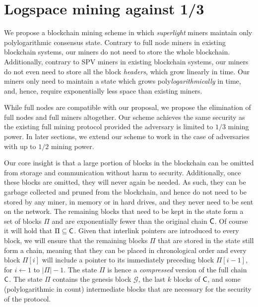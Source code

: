 \section{Logspace mining against 1/3}\label{sec.mining13}

We propose a blockchain mining scheme in which \emph{superlight} miners maintain
only polylogarithmic consensus state. Contrary to full node miners in existing
blockchain systems, our miners do not need to store the whole blockchain.
Additionally, contrary to SPV miners in existing blockchain systems, our miners
do not even need to store all the block \emph{headers}, which grow linearly in
time. Our miners only need to maintain a state which grows
poly\emph{logarithmically} in time, and, hence, require exponentially less space
than existing miners.

While full nodes are compatible with our proposal, we propose the elimination of
full nodes and full miners altogether. Our scheme achieves the same security as
the existing full mining protocol provided the adversary is limited to $1/3$
mining power. In later sections, we extend our scheme to work in the case of
adversaries with up to $1/2$ mining power.

Our core insight is that a large portion of blocks in the blockchain can be
omitted from storage and communication without harm to security. Additionally,
once these blocks are omitted, they will never again be needed. As such, they
can be garbage collected and pruned from the blockchain, and hence do not need
to be stored by any miner, in memory or in hard drives, and they never need to
be sent on the network. The remaining blocks that need to be kept in the state
form a set of blocks $\Pi$ and are exponentially fewer than the original chain
$\mathsf{C}$. Of course it will hold that $\Pi \subseteq \mathsf{C}$. Given that
interlink pointers are introduced to every block,
we will ensure that the remaining blocks $\Pi$ that are stored in the state
still form a chain, meaning that they can be placed in chronological order and
every block $\Pi[i]$ will include a pointer to its immediately preceding block
$\Pi[i - 1]$, for $i \gets 1$ to $|\Pi| - 1$. The state $\Pi$ is hence a
\emph{compressed} version of the full chain $\mathsf{C}$. The state $\Pi$ contains
the genesis block $\mathcal{G}$, the last $k$ blocks of $\mathsf{C}$, and some
(polylogarithmic in count) intermediate blocks that are necessary for the
security of the protocol.

